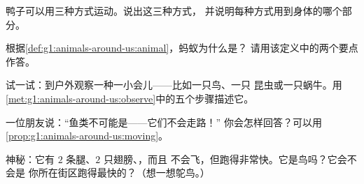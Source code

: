 \begin{exercise}[$\star$]\label{exo:g1:animals-around-us:6}
鸭子可以用三种方式运动。说出这三种方式，
并说明每种方式用到身体的哪个部分。
\end{exercise}

\begin{exercise}[$\star$]\label{exo:g1:animals-around-us:7}
根据\cref{def:g1:animals-around-us:animal}，蚂蚁为什么是？
请用该定义中的两个要点作答。
\end{exercise}

\begin{exercise}[$\star$]\label{exo:g1:animals-around-us:8}
试一试：到户外观察一种一小会儿——比如一只鸟、一只
昆虫或一只蜗牛。用
\cref{met:g1:animals-around-us:observe}中的五个步骤描述它。
\end{exercise}

\begin{exercise}[$\star\star$]\label{exo:g1:animals-around-us:9}
一位朋友说：“鱼类不可能是——它们不会走路！”
你会怎样回答？可以用\cref{prop:g1:animals-around-us:moving}。
\end{exercise}

\begin{exercise}[$\star\star$]\label{exo:g1:animals-around-us:10}
神秘：它有 $2$ 条腿、$2$ 只翅膀、，而且
不会飞，但跑得非常快。它是鸟吗？它会不会是
你所在街区跑得最快的？（想一想鸵鸟。）
\end{exercise}
